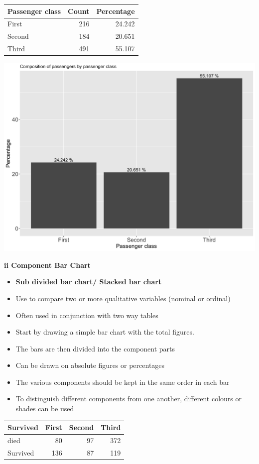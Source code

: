 \documentclass[]{book}
\providecommand{\tightlist}{%
  \setlength{\itemsep}{0pt}\setlength{\parskip}{0pt}}
\begin{document}
\begin{tabular}{l|r|r}
\hline
Passenger class & Count & Percentage\\
\hline
First & 216 & 24.242\\
\hline
Second & 184 & 20.651\\
\hline
Third & 491 & 55.107\\
\hline
\end{tabular}

\begin{center}\includegraphics[width=0.8\linewidth]{figure/box9-1} \end{center}

\textbf{ii Component Bar Chart }

\begin{itemize}
\tightlist
\item
  \textbf{Sub divided bar chart/ Stacked bar chart}
\item
  Use to compare two or more qualitative variables (nominal or ordinal)
\item
  Often used in conjunction with two way tables
\item
  Start by drawing a simple bar chart with the total figures.
\item
  The bars are then divided into the component parts
\item
  Can be drawn on absolute figures or percentages
\item
  The various components should be kept in the same order in each bar
\item
  To distinguish different components from one another, different colours or shades can be used
\end{itemize}

\begin{tabular}{l|r|r|r}
\hline
Survived & First & Second & Third\\
\hline
died & 80 & 97 & 372\\
\hline
Survived & 136 & 87 & 119\\
\hline
\end{tabular}
\end{document}
